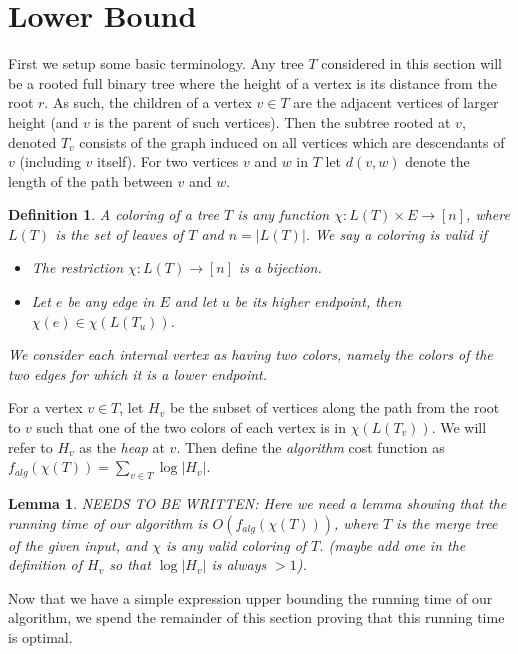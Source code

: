 \documentclass[11pt]{article}
\newtheorem{lemma}[theorem]{Lemma}
\newtheorem{definition}[theorem]{Definition}
\theoremstyle{definition}
\begin{document}
\pagebreak
\section{Lower Bound}
First we setup some basic terminology.
Any tree $T$ considered in this section will be a rooted full binary tree where the height of a vertex is its distance 
from the root $r$.  As such, the children of a vertex $v\in T$ are the adjacent vertices of larger height
(and $v$ is the parent of such vertices).  Then the subtree rooted at $v$, denoted $T_v$ consists of the graph induced on all 
vertices which are descendants of $v$ (including $v$ itself).  For two vertices $v$ and $w$ in $T$ let $d(v,w)$ denote the 
length of the path between $v$ and $w$.

\begin{definition}
 A coloring of a tree $T$ is any function $\chi:L(T)\times E \rightarrow [n]$, where $L(T)$ is the set of leaves of $T$ and $n = |L(T)|$.  
 We say a coloring is valid if
 \begin{itemize}
  \item The restriction $\chi:L(T) \rightarrow [n]$ is a bijection.
  \item Let $e$ be any edge in $E$ and let $u$ be its higher endpoint, then $\chi(e) \in \chi(L(T_u))$. 
 \end{itemize}
 We consider each internal vertex as having two colors, namely the colors of the two edges for which it is a lower endpoint.
\end{definition}

For a vertex $v\in T$, let $H_v$ be the subset of 
vertices along the path from the root to $v$ such that one of the two colors of each vertex is in $\chi(L(T_v))$.
We will refer to $H_v$ as the \emph{heap} at $v$.
Then define the \emph{algorithm} cost function as $f_{alg}(\chi(T)) = \sum_{v\in T} \log |H_v|$.

\begin{lemma}
\label{lem:algCost}
NEEDS TO BE WRITTEN:
Here we need a lemma showing that the running time of our algorithm is $O(f_{alg}(\chi(T)))$, where $T$ is the merge tree of the given input, 
and $\chi$ is any valid coloring of $T$.  (maybe add one in the definition of $H_v$ so that $\log |H_v|$ is always $>1$).
\end{lemma}

Now that we have a simple expression upper bounding the running time of our algorithm, we spend the remainder 
of this section proving that this running time is optimal.
\end{document}
